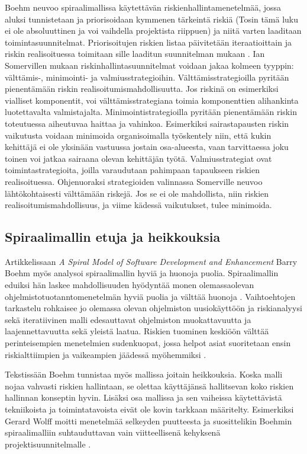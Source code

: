 \documentclass[finnish,12pt]{tktltiki2}
\theoremstyle{definition}
\theoremstyle{remark}
\begin{document}
Boehm neuvoo spiraalimallissa käytettävän riskienhallintamenetelmää, jossa aluksi tunnistetaan ja priorisoidaan kymmenen tärkeintä riskiä (Tosin tämä luku ei ole absoluuttinen ja voi vaihdella projektista riippuen) ja niitä varten laaditaan toimintasuunnitelmat. Priorisoitujen riskien listaa päivitetään iteraatioittain ja riskin realisoituessa toimitaan sille laaditun suunnitelman mukaan \cite{Boehm:1988:SMS:45797.45801}. Ian Somervillen mukaan riskinhallintasuunnitelmat voidaan jakaa kolmeen tyyppin: välttämis-, minimointi- ja valmiusstrategioihin\cite{Sommerville10}. Välttämisstrategioilla pyritään pienentämään riskin realisoitumismahdollisuutta. Jos riskinä on esimerkiksi vialliset komponentit, voi välttämisstrategiana toimia komponenttien alihankinta luotettavalta valmistajalta. Minimointistrategioilla pyritään pienentämään riskin toteutuessa aiheutuvaa haittaa ja vahinkoa. Esimerkiksi sairastapausten riskin vaikutusta voidaan minimoida organisoimalla työskentely niin, että kukin kehittäjä ei ole yksinään vastuussa jostain osa-alueesta, vaan tarvittaessa joku toinen voi jatkaa sairaana olevan kehittäjän työtä. Valmiusstrategiat ovat toimintastrategioita, joilla varaudutaan pahimpaan tapaukseen riskien realisoituessa. Ohjenuoraksi strategioiden valinnassa Somerville neuvoo lähtökohtaisesti välttämään riskejä. Jos se ei ole mahdollista, niin riskien realisoitumismahdollisuus, ja viime kädessä vaikutukset, tulee minimoida.

\subsection{Spiraalimallin etuja ja heikkouksia}

Artikkelissaan \textit{A Spiral Model of Software Development and Enhancement} \cite{Boehm:1988:SMS:45797.45801} Barry Boehm myös analysoi spiraalimallin hyviä ja huonoja puolia. Spiraalimallin eduiksi hän laskee mahdollisuuden hyödyntää monen olemassaolevan ohjelmistotuotanntomenetelmän hyviä puolia ja välttää huonoja \cite{Boehm:1988:SMS:45797.45801}. Vaihtoehtojen tarkastelu rohkaisee jo olemassa olevan ohjelmiston uusiokäyttöön ja riskianalyysi sekä iteratiivinen malli edesauttavat ohjelmiston muokattavuutta ja laajennettavuutta sekä yleistä laatua. Riskien tuominen keskiöön välttää perinteisempien menetelmien sudenkuopat, jossa helpot asiat suoritetaan ensin riskialttiimpien ja vaikeampien jäädessä myöhemmiksi \cite{Wolff:1989:MRS:107446.107478}. 

Tekstissään Boehm tunnistaa myös mallissa joitain heikkouksia. Koska malli nojaa vahvasti riskien hallintaan, se olettaa käyttäjänsä hallitsevan koko riskien hallinnan konseptin hyvin\cite{Boehm:1988:SMS:45797.45801}. Lisäksi osa mallissa ja sen vaiheissa käytettävistä tekniikoista ja toimintatavoista eivät ole kovin tarkkaan määritelty. Esimerkiksi Gerard Wolff moitti menetelmää selkeyden puutteesta ja suosittelikin Boehmin spiraalimalliin suhtauduttavan vain viitteellisenä kehyksenä projektisuunnitelmalle \cite{Wolff:1989:MRS:107446.107478}. 
\end{document}
